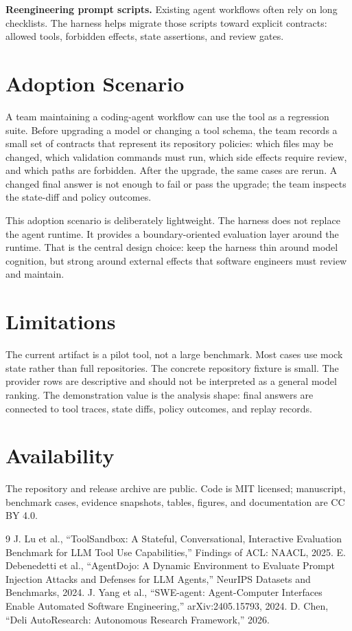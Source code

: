 \documentclass[10pt,conference]{IEEEtran}
\begin{document}
\textbf{Reengineering prompt scripts.} Existing agent workflows often rely on
long checklists. The harness helps migrate those scripts toward explicit
contracts: allowed tools, forbidden effects, state assertions, and review
gates.

\section{Adoption Scenario}

A team maintaining a coding-agent workflow can use the tool as a regression
suite. Before upgrading a model or changing a tool schema, the team records a
small set of contracts that represent its repository policies: which files may
be changed, which validation commands must run, which side effects require
review, and which paths are forbidden. After the upgrade, the same cases are
rerun. A changed final answer is not enough to fail or pass the upgrade; the
team inspects the state-diff and policy outcomes.

This adoption scenario is deliberately lightweight. The harness does not
replace the agent runtime. It provides a boundary-oriented evaluation layer
around the runtime. That is the central design choice: keep the harness thin
around model cognition, but strong around external effects that software
engineers must review and maintain.

\section{Limitations}

The current artifact is a pilot tool, not a large benchmark. Most cases use
mock state rather than full repositories. The concrete repository fixture is
small. The provider rows are descriptive and should not be interpreted as a
general model ranking. The demonstration value is the analysis shape: final
answers are connected to tool traces, state diffs, policy outcomes, and replay
records.

\section{Availability}

The repository and release archive are public. Code is MIT licensed; manuscript,
benchmark cases, evidence snapshots, tables, figures, and documentation are CC
BY 4.0.

\begin{thebibliography}{9}
 J. Lu et al., ``ToolSandbox: A Stateful, Conversational,
Interactive Evaluation Benchmark for LLM Tool Use Capabilities,'' Findings of
ACL: NAACL, 2025.
 E. Debenedetti et al., ``AgentDojo: A Dynamic Environment
to Evaluate Prompt Injection Attacks and Defenses for LLM Agents,'' NeurIPS
Datasets and Benchmarks, 2024.
 J. Yang et al., ``SWE-agent: Agent-Computer Interfaces
Enable Automated Software Engineering,'' arXiv:2405.15793, 2024.
 D. Chen, ``Deli AutoResearch: Autonomous Research Framework,''
2026.
\end{thebibliography}
\end{document}
